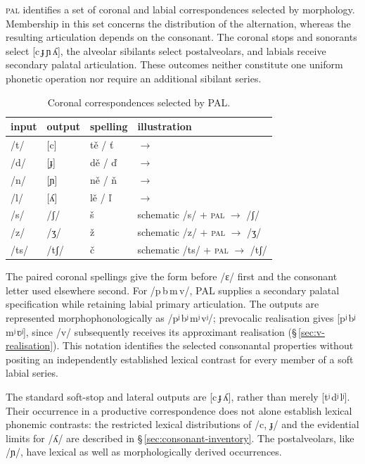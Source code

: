 \textsc{pal} identifies a set of coronal and labial correspondences selected
by morphology. Membership in this set concerns the distribution of the
alternation, whereas the resulting articulation depends on the consonant.
The coronal stops and sonorants select [c\,ɟ\,ɲ\,ʎ], the alveolar sibilants
select postalveolars, and labials receive secondary palatal articulation.
These outcomes neither constitute one uniform phonetic operation nor require
an additional sibilant series.

\begin{table}[ht]
	\footnotesize
	\caption{Coronal correspondences selected by PAL.}\label{tab:soft-coronals}
	\begin{tabularx}{0.9\textwidth}{L L L L}
		\toprule
		{\sc input} & {\sc output} & {\sc spelling} & {\sc illustration} \\
		\midrule
		/t/ & [c] & tě / ť &  $\rightarrow$  \\
		/d/ & [ɟ] & dě / ď &  $\rightarrow$  \\
		/n/ & [ɲ] & ně / ň &  $\rightarrow$  \\
		/l/ & [ʎ] & lě / ľ &  $\rightarrow$  \\
		/s/ & /ʃ/ & š & schematic /s/ + \textsc{pal} $\rightarrow$ /ʃ/ \\
		/z/ & /ʒ/ & ž & schematic /z/ + \textsc{pal} $\rightarrow$ /ʒ/ \\
		/ts/ & /tʃ/ & č & schematic /ts/ + \textsc{pal} $\rightarrow$ /tʃ/ \\
		\bottomrule
	\end{tabularx}
\end{table}

The paired coronal spellings give the form before /ɛ/ first and the
consonant letter used elsewhere second. For /p\,b\,m\,v/, PAL supplies a secondary palatal specification while
retaining labial primary articulation. The outputs are represented
morphophonologically as /pʲ\,bʲ\,mʲ\,vʲ/; prevocalic realisation gives
[pʲ\,bʲ\,mʲ\,ʋʲ], since /v/ subsequently receives its approximant
realisation (§\,\ref{sec:v-realisation}). This notation identifies the
selected consonantal properties without positing an independently established
lexical contrast for every member of a soft labial series.

The standard soft-stop and lateral outputs are [c\,ɟ\,ʎ], rather than
merely [tʲ\,dʲ\,lʲ]. Their occurrence in a productive correspondence does
not alone establish lexical phonemic contrasts: the restricted lexical
distributions of /c, ɟ/ and the evidential limits for /ʎ/ are described in
§\,\ref{sec:consonant-inventory}. The postalveolars, like /ɲ/, have lexical
as well as morphologically derived occurrences.

